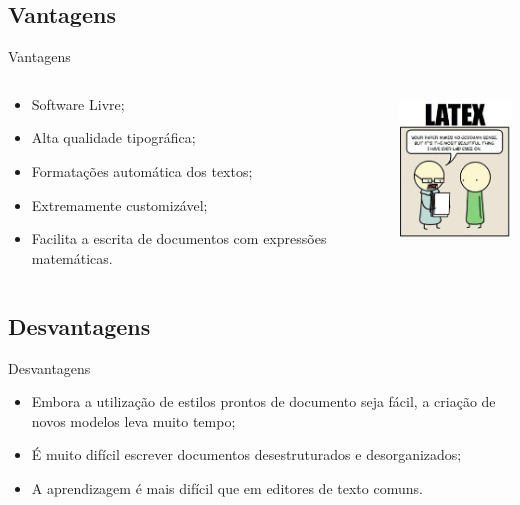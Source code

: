 \documentclass [11pt, a4paper]{beamer}
\begin{document}
\subsection{Vantagens}
\begin{frame}{Vantagens}
\begin{columns}[T]
    \begin{column}[T]{5cm}
        \begin{itemize}
            \item Software Livre;
            \item Alta qualidade tipográfica;
            \item Formatações automática dos textos;
            \item Extremamente customizável;
            \item Facilita a escrita de documentos com expressões matemáticas.
        \end{itemize}
    \end{column}

    \begin{column}[T]{5cm}
        \centering
        \includegraphics[height=4cm]{Figures/hq.png}
    \end{column}
\end{columns}
\end{frame}

\subsection{Desvantagens}

\begin{frame}{Desvantagens}
\begin{itemize}
    \item Embora a utilização de estilos prontos de documento seja fácil, a criação de novos modelos leva muito tempo;
    \item É muito difícil escrever documentos desestruturados e desorganizados;
    \item A aprendizagem é mais difícil que em editores de texto comuns.
\end{itemize}
\end{frame}
\end{document}
